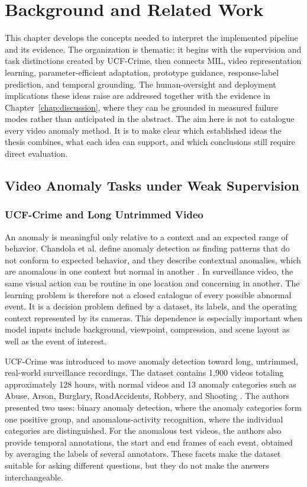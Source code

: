 \chapter{Background and Related Work}
\label{chap:background}

This chapter develops the concepts needed to interpret the implemented pipeline
and its evidence. The organization is thematic: it begins with the supervision
and task distinctions created by UCF-Crime, then connects MIL, video representation learning, parameter-efficient adaptation,
prototype guidance, response-label prediction, and temporal grounding. The
human-oversight and deployment implications these ideas raise are addressed
together with the evidence in Chapter~\ref{chap:discussion}, where they can be
grounded in measured failure modes rather than anticipated in the abstract.
The aim here is not to catalogue every video anomaly method. It is to make
clear which established ideas the thesis combines, what each idea can support,
and which conclusions still require direct evaluation.

\section{Video Anomaly Tasks under Weak Supervision}
\label{sec:background-tasks}

\subsection{UCF-Crime and Long Untrimmed Video}

An anomaly is meaningful only relative to a context and an expected range of
behavior. Chandola et al. define anomaly detection as finding patterns that do
not conform to expected behavior, and they describe contextual anomalies, which
are anomalous in one context but normal in another \cite{chandola2009anomaly}.
In surveillance video, the same visual action can be routine in one
location and concerning in another. The learning problem is therefore not a
closed catalogue of every possible abnormal event. It is a decision problem
defined by a dataset, its labels, and the operating context represented by its
cameras. This dependence is especially important when model inputs include
background, viewpoint, compression, and scene layout as well as the event of
interest.

UCF-Crime was introduced to move anomaly detection toward long, untrimmed,
real-world surveillance recordings. The dataset contains 1,900 videos totaling
approximately 128 hours, with normal videos and 13 anomaly categories such as
Abuse, Arson, Burglary, RoadAccidents, Robbery, and Shooting
\cite{sultani2018real}. The authors presented two uses: binary anomaly detection,
where the anomaly categories form one positive group, and anomalous-activity
recognition, where the individual categories are distinguished. For the
anomalous test videos, the authors also provide temporal annotations, the start
and end frames of each event, obtained by averaging the labels of several
annotators. These
facets make the dataset suitable for asking different questions, but they do not
make the answers interchangeable.

